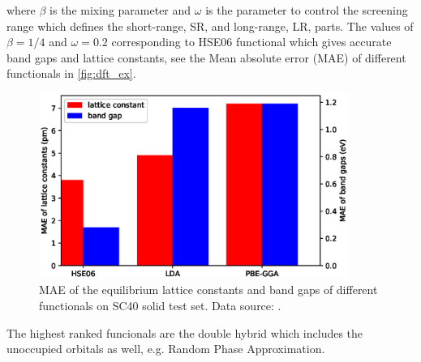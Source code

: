 where $\beta$ is the mixing parameter and $\omega$ is the parameter to control the screening range which defines the short-range, SR, and long-range, LR, parts. The values of $\beta=1/4$ and $\omega=0.2$ corresponding to HSE06 functional which gives accurate band gaps and lattice constants, see the Mean absolute error (MAE) of different functionals in \autoref{fig:dft_ex}. 
\begin{figure}[htbp!] 
\centering  
\includegraphics[width=0.9\textwidth]{lat_ex.eps}
\caption{ MAE of the equilibrium lattice constants and band gaps of different functionals on SC40 solid test set\protect\footnotemark[1] . Data source: \cite{Lucero2012}.}  
\label{fig:dft_ex}
\end{figure} 
The highest ranked funcionals are the double hybrid which includes the unoccupied orbitals as well, e.g. Random Phase Approximation\cite{Langreth1980}. 
